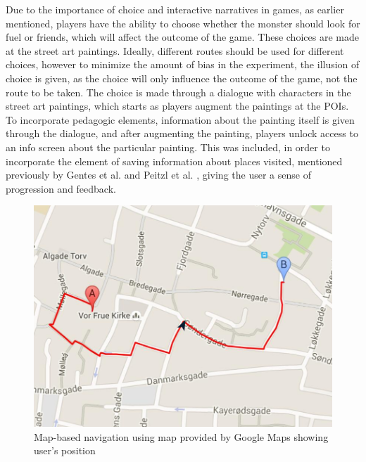 Due to the importance of choice and interactive narratives in games, as earlier mentioned, players have the ability to choose whether the monster should look for fuel or friends, which will affect the outcome of the game. These choices are made at the street art paintings. Ideally, different routes should be used for different choices, however to minimize the amount of bias in the experiment, the illusion of choice is given, as the choice will only influence the outcome of the game, not the route to be taken. The choice is made through a dialogue with characters in the street art paintings, which starts as players augment the paintings at the POIs. To incorporate pedagogic elements, information about the painting itself is given through the dialogue, and after augmenting the painting, players unlock access to an info screen about the particular painting. This was included, in order to incorporate the element of saving information about places visited, mentioned previously by Gentes et al. \cite{GamingOnTheMove} and Peitzl et al. \cite{Insectopia}, giving the user a sense of progression and feedback. 

\begin{figure}[hbtp]
\centering
\includegraphics[scale=0.24]{Pics/MapNav.png}
\caption{Map-based navigation using map provided by Google Maps showing user's position}
\label{map}
\end{figure}

